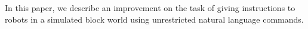 In this paper, we describe an improvement on the task of giving instructions to robots in a simulated block world using unrestricted natural language commands.
